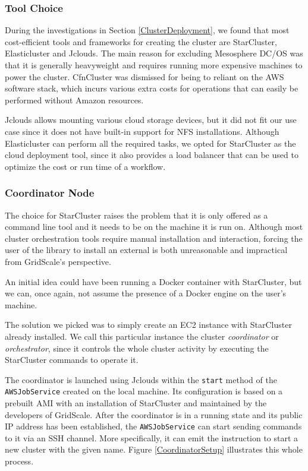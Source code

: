 \subsubsection{Tool Choice}

During the investigations in Section \ref{ClusterDeployment}, we found that most cost-efficient tools and frameworks for creating the cluster are StarCluster, Elasticluster and Jclouds. The main reason for excluding Mesosphere DC/OS was that it is generally heavyweight and requires running more expensive machines to power the cluster. CfnCluster was dismissed for being to reliant on the AWS software stack, which incurs various extra costs for operations that can easily be performed without Amazon resources.

Jclouds allows mounting various cloud storage devices, but it did not fit our use case since it does not have built-in support for NFS installations. Although Elasticluster can perform all the required tasks, we opted for StarCluster as the cloud deployment tool, since it also provides a load balancer that can be used to optimize the cost or run time of a workflow.

\subsubsection{Coordinator Node} \label{CoordinatorNodeSection}

The choice for StarCluster raises the problem that it is only offered as a command line tool and it needs to be on the machine it is run on. Although most cluster orchestration tools require manual installation and interaction, forcing the user of the library to install an external is both unreasonable and impractical from GridScale's perspective. 

An initial idea could have been running a Docker container with StarCluster, but we can, once again, not assume the presence of a Docker engine on the user's machine.

The solution we picked was to simply create an EC2 instance with StarCluster already installed. We call this particular instance the cluster \textit{coordinator} or \textit{orchestrator}, since it controls the whole cluster activity by executing the StarCluster commands to operate it. 

The coordinator is launched using Jclouds within the \verb|start| method of the \verb|AWSJobService| created on the local machine. Its configuration is based on a prebuilt AMI with an installation of StarCluster and maintained by the developers of GridScale. After the coordinator is in a running state and its public IP address has been established, the \verb|AWSJobService| can start sending commands to it via an SSH channel. More specifically, it can emit the instruction to start a new cluster with the given name. Figure \ref{CoordinatorSetup} illustrates this whole process.

